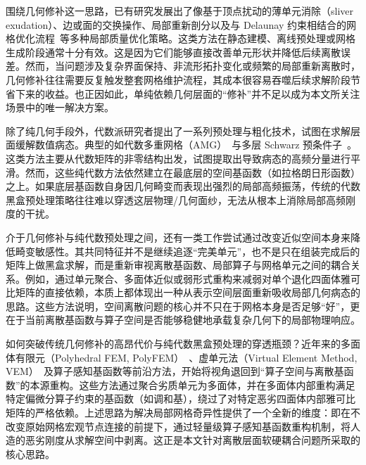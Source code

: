 围绕几何修补这一思路，已有研究发展出了像基于顶点扰动的薄单元消除（sliver exudation）、边或面的交换操作、局部重新剖分以及与 Delaunay 约束相结合的网格优化流程~\cite{Cheng1999SliverExudation, RH2005EliminateSlivers, Tournois2009PerturbingSlivers}等多种局部质量优化策略。这类方法在静态建模、离线预处理或网格生成阶段通常十分有效。这是因为它们能够直接改善单元形状并降低后续离散误差。然而，当问题涉及复杂界面保持、非流形拓扑变化或频繁的局部重新离散时，几何修补往往需要反复触发整套网格维护流程，其成本很容易吞噬后续求解阶段节省下来的收益。也正因如此，单纯依赖几何层面的“修补”并不足以成为本文所关注场景中的唯一解决方案。

除了纯几何手段外，代数派研究者提出了一系列预处理与粗化技术，试图在求解层面缓解数值病态。典型的如代数多重网格（AMG）~\cite{Griebel2003amgElas}与多层 Schwarz 预条件子~\cite{Wu2022schwarz}。这类方法主要从代数矩阵的非零结构出发，试图提取出导致病态的高频分量进行平滑。然而，这些纯代数方法依然建立在最底层的空间基函数（如拉格朗日形函数）之上。如果底层基函数自身因几何畸变而表现出强烈的局部高频振荡，传统的代数黑盒预处理策略往往难以穿透这层物理/几何面纱，无法从根本上消除局部高频刚度的干扰。

介于几何修补与纯代数预处理之间，还有一类工作尝试通过改变近似空间本身来降低畸变敏感性。其共同特征并不是继续追逐“完美单元”，也不是只在组装完成后的矩阵上做黑盒求解，而是重新审视离散基函数、局部算子与网格单元之间的耦合关系。例如，通过单元聚合、多面体近似或弱形式重构来减弱对单个退化四面体雅可比矩阵的直接依赖，本质上都体现出一种从表示空间层面重新吸收局部几何病态的思路。这些方法说明，空间离散问题的核心并不只在于网格本身是否足够“好”，更在于当前离散基函数与算子空间是否能够稳健地承载复杂几何下的局部物理响应。

如何突破传统几何修补的高昂代价与纯代数黑盒预处理的穿透瓶颈？近年来的多面体有限元（Polyhedral FEM, PolyFEM）~\cite{SukumarMalsch2006}、虚单元法（Virtual Element Method, VEM）~\cite{BeiraoDaVeiga2013a_VEMBasic, Jabbari2022AdaptiveRefinement}及算子感知基函数等前沿方法，开始将视角退回到“算子空间与离散基函数”的本源重构。这些方法通过聚合劣质单元为多面体，并在多面体内部重构满足特定偏微分算子约束的基函数（如调和基），绕过了对特定恶劣四面体内部雅可比矩阵的严格依赖。上述思路为解决局部网格奇异性提供了一个全新的维度：即在不改变原始网格宏观节点连接的前提下，通过轻量级算子感知基函数重构机制，将人造的恶劣刚度从求解空间中剥离。这正是本文针对离散层面软硬耦合问题所采取的核心思路。
